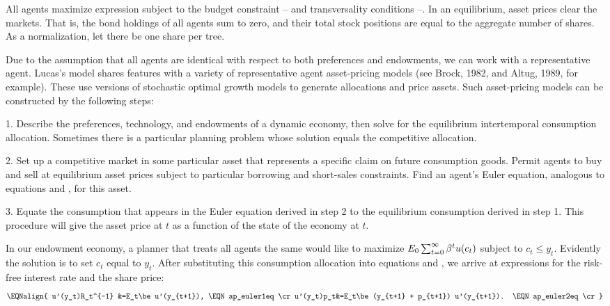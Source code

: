 All agents maximize expression  subject to the
budget constraint -- and transversality
conditions --. In an equilibrium, asset prices
clear the markets. That is, the bond holdings of all
agents sum to zero, and their total stock positions are equal to
the aggregate number of shares. As a normalization, let there be
one share per tree.

Due to the assumption that all agents are identical with respect to both
preferences and endowments, we can work with a representative
agent.
Lucas's model shares features with a variety of
representative agent asset-pricing models (see Brock, 1982, and Altug,
1989, for example).  These use versions of stochastic optimal growth models
to generate allocations and price assets.
Such asset-pricing models can be constructed by the following
steps:
%



\medskip

\item{1.} Describe the preferences, technology, and endowments of a dynamic
economy, then solve for the equilibrium intertemporal consumption allocation.
Sometimes there is a particular  planning problem
whose solution equals the competitive allocation.

\medskip

\item{2.} Set up a competitive market in some particular asset that
represents a specific claim on future consumption goods.  Permit
agents to buy and sell at equilibrium asset prices subject to particular
borrowing and short-sales constraints.  Find an agent's Euler equation,
analogous to equations  and , for this asset.

\medskip

\item{3.} Equate the consumption that appears in the Euler equation
derived in step 2 to the equilibrium consumption derived in step 1.
This procedure will give the asset price at $t$ as a function of the
state of the economy at $t$.

\medskip
\noindent
In our endowment economy, a planner that treats all agents the same
would like to maximize
$E_0\sum_{t=0}^\infty {\beta}^t u(c_t)$ subject to $c_t\le y_t$.  Evidently the
solution is to set $c_t$ equal to $y_t$. After substituting this
consumption allocation into equations
 and , we arrive
at expressions for the risk-free interest rate and
the share price:
$$\EQNalign{
u'(y_t)R_t^{-1} &=E_t\be u'(y_{t+1}),                       \EQN ap_euler1eq  \cr
u'(y_t)p_t&=E_t\be (y_{t+1} + p_{t+1}) u'(y_{t+1}).    \EQN ap_euler2eq  \cr}
$$


